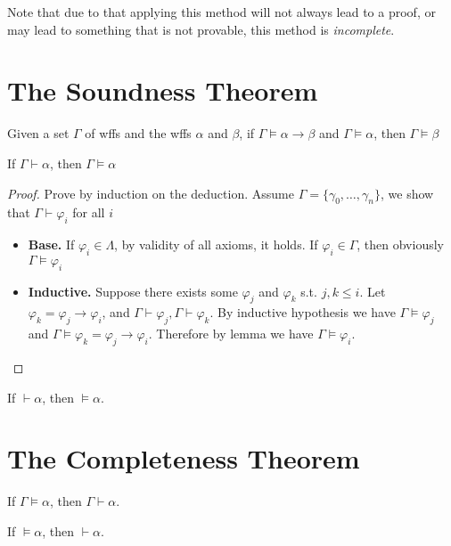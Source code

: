 Note that due to that applying this method will not always lead to a proof, or may lead to something that is not provable, this method is \emph{incomplete}.

\section{The Soundness Theorem}

\begin{lemma}
    Given a set $\Gamma$ of wffs and the wffs $\alpha$ and $\beta$, if $\Gamma\vDash\alpha\to\beta$ and $\Gamma\vDash\alpha$, then $\Gamma\vDash\beta$
\end{lemma}

\begin{theorem}
    \label{thm:SoundnessTheorem}
    If $\Gamma\vdash\alpha$, then $\Gamma\vDash\alpha$
\end{theorem}
\begin{proof}
    Prove by induction on the deduction. Assume $\Gamma=\{ \gamma_0,\dots,\gamma_n \}$, we show that $\Gamma\vdash\varphi_i$ for all $i$
    \begin{itemize}
        \item[] \textbf{Base.} If $\varphi_i \in \Lambda$, by validity of all axioms, it holds. If $\varphi_i \in \Gamma$, then obviously $\Gamma\vDash\varphi_i$
        \item[] \textbf{Inductive.} Suppose there exists some $\varphi_j$ and $\varphi_k$ s.t. $j,k \le i$. Let $\varphi_k = \varphi_j \to \varphi_i$, and $\Gamma\vdash\varphi_j, \Gamma\vdash\varphi_k$. By inductive hypothesis we have $\Gamma\vDash\varphi_j$ and $\Gamma\vDash\varphi_k=\varphi_j\to\varphi_i$. Therefore by lemma we have $\Gamma\vDash\varphi_i$. 
    \end{itemize}
\end{proof}

\begin{corollary}
    If $\vdash\alpha$, then $\vDash\alpha$.
\end{corollary}

\section{The Completeness Theorem}

\begin{theorem}
    If $\Gamma\vDash\alpha$, then $\Gamma\vdash\alpha$.
\end{theorem}

\begin{corollary}
    If $\vDash\alpha$, then $\vdash\alpha$.
\end{corollary}
